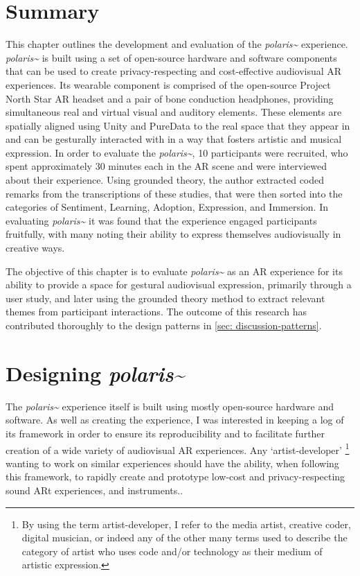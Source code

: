     
\clearpage
   
\section{Summary}\label{sec: polaris-summary}
This chapter outlines the development and evaluation of the \textit{polaris\textasciitilde{}} experience. \textit{polaris\textasciitilde{}} is built using a set of open-source hardware and software components that can be used to create privacy-respecting and cost-effective audiovisual AR experiences. Its wearable component is comprised of the open-source Project North Star AR headset and a pair of bone conduction headphones, providing simultaneous real and virtual visual and auditory elements. These elements are spatially aligned using Unity and PureData to the real space that they appear in and can be gesturally interacted with in a way that fosters artistic and musical expression. In order to evaluate the \textit{polaris\textasciitilde{}}, 10 participants were recruited, who spent approximately 30 minutes each in the AR scene and were interviewed about their experience. Using grounded theory, the author extracted coded remarks from the transcriptions of these studies, that were then sorted into the categories of Sentiment, Learning, Adoption, Expression, and Immersion. In evaluating \textit{polaris\textasciitilde{}} it was found that the experience engaged participants fruitfully, with many noting their ability to express themselves audiovisually in creative ways.

The objective of this chapter is to evaluate \textit{polaris\textasciitilde{}} as an AR experience for its ability to provide a space for gestural audiovisual expression, primarily through a user study, and later using the grounded theory method to extract relevant themes from participant interactions. The outcome of this research has contributed thoroughly to the design patterns in \autoref{sec: discussion-patterns}.



\section{Designing \textit{polaris\textasciitilde{}}}\label{sec: polaris-framework}
The \textit{polaris\textasciitilde{}} experience itself is built using mostly open-source hardware and software. As well as creating the experience, I was interested in keeping a log of its framework in order to ensure its reproducibility and to facilitate further creation of a wide variety of audiovisual AR experiences. Any `artist-developer' \footnote{By using the term artist-developer, I refer to the media artist, creative coder, digital musician, or indeed any of the other many terms used to describe the category of artist who uses code and/or technology as their medium of artistic expression.} wanting to work on similar experiences should have the ability, when following this framework, to rapidly create and prototype low-cost and privacy-respecting sound ARt experiences, and instruments..


